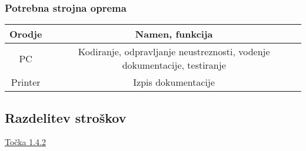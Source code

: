 \documentclass[a4paper,12pt]{article}
\begin{document}
		\subsubsection{Potrebna strojna oprema}
			\begin{center}
			\begin{tabular}{|c|c|}
					\hline
					\rowcolor{yellow!40!} Orodje& Namen, funkcija\\
					\hline
					PC& Kodiranje, odpravljanje neustreznosti, vodenje dokumentacije, testiranje\\
					\hline
					Printer&Izpis dokumentacije\\
					\hline	
			\end{tabular}
			\end{center}


	\subsection{Razdelitev stroškov}
		\qquad \qquad \textcolor[HTML]{C50918}{\hyperlink{subsubsection.1.4.2}{Točka 1.4.2}}

\newpage
\end{document}
